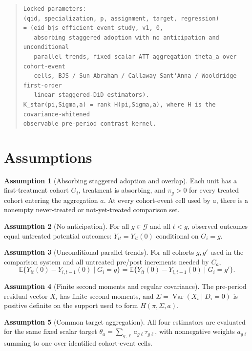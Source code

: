 \documentclass[11pt]{article}
\newcommand{\E}{\mathbb{E}}
\theoremstyle{definition}
\newtheorem{assumption}{Assumption}
\theoremstyle{plain}
\theoremstyle{remark}
\begin{document}
\begin{quote}
\begin{verbatim}
Locked parameters:
(qid, specialization, p, assignment, target, regression)
= (eid_bjs_efficient_event_study, v1, 0,
   absorbing staggered adoption with no anticipation and unconditional
   parallel trends, fixed scalar ATT aggregation theta_a over cohort-event
   cells, BJS / Sun-Abraham / Callaway-Sant'Anna / Wooldridge first-order
   linear staggered-DiD estimators).
K_star(pi,Sigma,a) = rank H(pi,Sigma,a), where H is the covariance-whitened
observable pre-period contrast kernel.
\end{verbatim}
\end{quote}

\section{Assumptions}
\begin{assumption}[Absorbing staggered adoption and overlap]\label{ass:adoption}
Each unit has a first-treatment cohort \(G_i\), treatment is absorbing, and
\(\pi_g>0\) for every treated cohort entering the aggregation \(a\).  At every
cohort-event cell used by \(a\), there is a nonempty never-treated or
not-yet-treated comparison set.
\end{assumption}

\begin{assumption}[No anticipation]\label{ass:no-anticipation}
For all \(g\in\mathcal G\) and all \(t<g\), observed outcomes equal untreated
potential outcomes: \(Y_{it}=Y_{it}(0)\) conditional on \(G_i=g\).
\end{assumption}

\begin{assumption}[Unconditional parallel trends]\label{ass:parallel}
For all cohorts \(g,g'\) used in the comparison system and all untreated
pre/post increments needed by \(C_a\),
\[
\E\{Y_{it}(0)-Y_{i,t-1}(0)\mid G_i=g\}
=
\E\{Y_{it}(0)-Y_{i,t-1}(0)\mid G_i=g'\}.
\]
\end{assumption}

\begin{assumption}[Finite second moments and regular covariance]\label{ass:covariance}
The pre-period residual vector \(X_i\) has finite second moments, and
\(\Sigma=\operatorname{Var}(X_i\mid D_i=0)\) is positive definite on the support
used to form \(H(\pi,\Sigma,a)\).
\end{assumption}

\begin{assumption}[Common target aggregation]\label{ass:common-target}
All four estimators are evaluated for the same fixed scalar target
\(\theta_a=\sum_{g,\ell}a_{g\ell}\tau_{g\ell}\), with nonnegative weights
\(a_{g\ell}\) summing to one over identified cohort-event cells.
\end{assumption}
\end{document}
